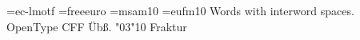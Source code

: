  
\font\otf=ec-lmotf \font\eu=freeeuro \font\ms=msam10 \font\eufm=eufm10
\pdfinterwordspaceon
Words with interword spaces. \otf OpenType CFF \"Ub\ss. \eu {}
\pdfinterwordspaceoff
\ms \char"03\char"10 \eufm Fraktur
\bye
